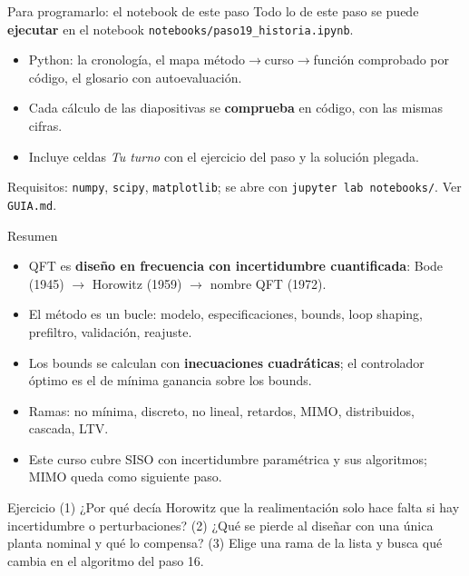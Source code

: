 \documentclass[aspectratio=169,11pt]{beamer}
\begin{document}
\begin{frame}{Para programarlo: el notebook de este paso}
  \small
  Todo lo de este paso se puede \textbf{ejecutar} en el notebook \texttt{notebooks/paso19\_historia.ipynb}.
  \begin{itemize}
    \item Python: la cronología, el mapa método$\to$curso$\to$función comprobado por código, el glosario con autoevaluación.
    \item Cada cálculo de las diapositivas se \textbf{comprueba} en código, con las mismas cifras.
    \item Incluye celdas \emph{Tu turno} con el ejercicio del paso y la solución plegada.
  \end{itemize}
  \footnotesize Requisitos: \texttt{numpy}, \texttt{scipy}, \texttt{matplotlib}; se abre con \texttt{jupyter lab notebooks/}. Ver \texttt{GUIA.md}.
\end{frame}

\begin{frame}{Resumen}
  \small
  \begin{itemize}
    \item QFT es \textbf{diseño en frecuencia con incertidumbre cuantificada}: Bode (1945) $\to$ Horowitz (1959) $\to$ nombre QFT (1972).
    \item El método es un bucle: modelo, especificaciones, bounds, loop shaping, prefiltro, validación, reajuste.
    \item Los bounds se calculan con \textbf{inecuaciones cuadráticas}; el controlador óptimo es el de mínima ganancia sobre los bounds.
    \item Ramas: no mínima, discreto, no lineal, retardos, MIMO, distribuidos, cascada, LTV.
    \item Este curso cubre SISO con incertidumbre paramétrica y sus algoritmos; MIMO queda como siguiente paso.
  \end{itemize}
  \begin{block}{Ejercicio}
    (1) ¿Por qué decía Horowitz que la realimentación solo hace falta si hay incertidumbre o perturbaciones? (2) ¿Qué se pierde al diseñar con una única planta nominal y qué lo compensa? (3) Elige una rama de la lista y busca qué cambia en el algoritmo del paso 16.
  \end{block}
\end{frame}
\end{document}
